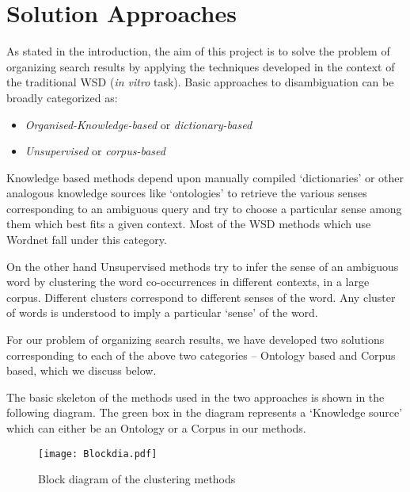 \documentclass[a4paper,12pt]{report}
\begin{document}
\section{Solution Approaches}
As stated in the introduction, the aim of this project is to solve the
problem of organizing search results by applying the techniques
developed in the context of the traditional WSD ({\it in vitro}
task). Basic approaches to disambiguation can be broadly categorized
as:
\begin{itemize}
  \item {\it Organised-Knowledge-based} or {\it dictionary-based}
  \item {\it Unsupervised} or {\it corpus-based}
\end{itemize}

Knowledge based methods depend upon manually compiled `dictionaries'
or other analogous knowledge sources like `ontologies' to retrieve the
various senses corresponding to an ambiguous query and try to choose a
particular sense among them which best fits a given context. Most of
the WSD methods which use Wordnet fall under this category.

On the other hand Unsupervised methods try to infer the sense of an
ambiguous word by clustering the word co-occurrences in different
contexts, in a large corpus. Different clusters correspond to
different senses of the word. Any cluster of words is understood to
imply a particular `sense' of the word.

For our problem of organizing search results, we have developed two
solutions corresponding to each of the above two categories --
Ontology based and Corpus based, which we discuss below. 

The basic skeleton of the methods used in the two approaches is shown
in the following diagram. The green box in the diagram represents a
`Knowledge source' which can either be an Ontology or a Corpus in our
methods. 
\begin{figure}[h]
  \centering
  \texttt{[image: Blockdia.pdf]}
  \caption{Block diagram of the clustering methods}
\end{figure}
\end{document}
